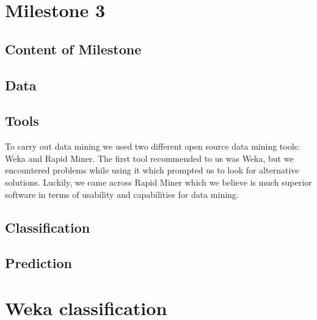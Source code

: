 


\chapter{Milestone 3} \label{cha:ml3}
    \section{Content of Milestone} 
        \label{sec:ml3_content}
    

    \section{Data} 
        \label{sec:ml3_data}
    

    \section{Tools} %
    \label{sub:Tools}
    To carry out data mining we used two different open source data mining tools: Weka and Rapid Miner. The first tool recommended to us was Weka, but we encountered problems while using it which prompted us to look for alternative solutions. Luckily, we came across Rapid Miner which we believe is much superior software in terms of usability and capabilities for data mining.
    
    

    \section{Classification} %
    \label{sec:Classification}
    

    \section{Prediction} %
    \label{sub:Prediction}
    

    \appendix
    \chapter{Weka classification} %
    \label{cha:Weka}
    
    


